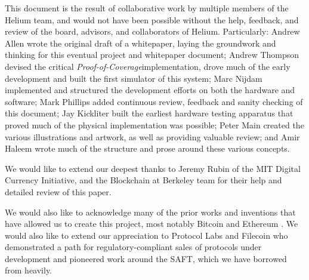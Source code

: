 \documentclass[letterpaper,11pt]{article}
\newcommand{\proofofcoverage}{\textit{Proof-of-Coverage}}
\begin{document}
This document is the result of collaborative work by multiple members of the Helium team, and would not have been possible without the help, feedback, and review of the board, advisors, and collaborators of Helium. Particularly: Andrew Allen wrote the original draft of a whitepaper, laying the groundwork and thinking for this eventual project and whitepaper document; Andrew Thompson devised the critical \proofofcoverage implementation, drove much of the early development and built the first simulator of this system; Marc Nijdam implemented and structured the development efforts on both the hardware and software; Mark Phillips added continuous review, feedback and sanity checking of this document; Jay Kickliter built the earliest hardware testing apparatus that proved much of the physical implementation was possible; Peter Main created the various illustrations and artwork, as well as providing valuable review; and Amir Haleem wrote much of the structure and prose around these various concepts.\newline

We would like to extend our deepest thanks to Jeremy Rubin of the MIT Digital Currency Initiative, and the Blockchain at Berkeley team for their help and detailed review of this paper.\newline

We would also like to acknowledge many of the prior works and inventions that have allowed us to create this project, most notably Bitcoin \cite{bitcoin} and Ethereum \cite{ethereum}. We would also like to extend our appreciation to Protocol Labs \cite{protocol} and Filecoin \cite{filecoin} who demonstrated a path for regulatory-compliant sales of protocols under development and pioneered work around the SAFT, which we have borrowed from heavily.
\newpage
\end{document}
